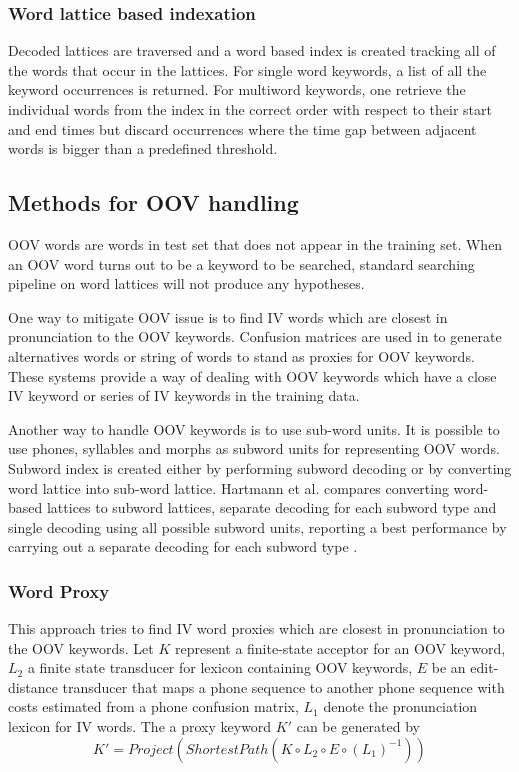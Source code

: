\documentclass[journal]{IEEEtran}
\begin{document}
\subsubsection{Word lattice based indexation}
Decoded lattices are traversed and a word based index is created tracking all of the words that occur in the lattices.
For single word keywords, a list of all the keyword occurrences is returned. For multiword keywords, one retrieve 
the individual words from the index in the correct order with respect to their start and end times but discard occurrences
where the time gap between adjacent words is bigger than a predefined threshold.

\subsection{Methods for OOV handling}
OOV words are words in test set that does not appear in the training set. When an OOV word turns out to be 
a keyword to be searched, standard searching pipeline on word lattices will not produce any hypotheses.

One way to mitigate OOV issue is to find IV words which are closest in pronunciation to the OOV keywords. 
Confusion matrices are used in \cite{lidia2014effi,chen2013using,li2000query,saraclar2013empirical} to 
generate alternatives  words or string of words to stand as proxies for OOV keywords. These systems provide 
a way of dealing with OOV keywords  which have a close IV keyword or series of IV keywords in the training data.

Another way to handle OOV keywords is to use sub-word units. It is possible to use phones, syllables and
morphs as subword units for representing OOV words. Subword index is created either by performing subword decoding
\cite{bacchiani2005fast, yanzhang2014subword, bulyko2012subword} or by converting word lattice 
into sub-word lattice\cite{karakos2014norm, saraclar2004lattice}. Hartmann et al. compares converting
word-based lattices to subword lattices, separate decoding for each subword type and single decoding using all 
possible subword units, reporting a best performance by carrying out a separate decoding for each subword 
type \cite{hartmann2014comparing}.

\subsubsection{Word Proxy}
This approach tries to find IV word proxies which are closest in pronunciation to the OOV keywords. Let
$K$ represent a finite-state acceptor for an OOV keyword, $L_2$ a finite state transducer for lexicon containing
OOV keywords, $E$ be an edit-distance transducer that maps a phone sequence to another phone sequence with costs
estimated from a phone confusion matrix, $L_1$ denote the pronunciation lexicon for IV words. The a proxy keyword
$K'$ can be generated by
\begin{equation}
K'=Project(ShortestPath(K \circ L_2 \circ E \circ (L_1)^{-1}))
\end{equation}
\end{document}
